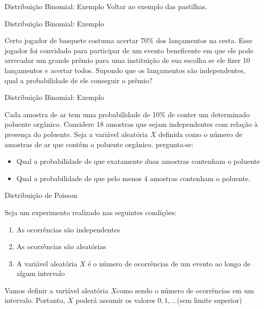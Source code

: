 \begin{frame}{Distribuição Binomial: Exemplo}
    Voltar ao exemplo das pastilhas. 
\end{frame}
\begin{frame}{Distribuição Binomial: Exemplo}
    \begin{exemplo}[14]
        Certo jogador de basquete costuma acertar 70\% dos lançamentos
na cesta. Esse jogador foi convidado para participar de um evento beneficente
em que ele pode arrecadar um grande prêmio para uma instituição de sua escolha se ele fizer 10 lançamentos e acertar todos. Supondo que os lançamentos
são independentes, qual a probabilidade de ele conseguir o prêmio?
    \end{exemplo}
\end{frame}

\begin{frame}{Distribuição Binomial: Exemplo}
    \begin{exemplo}[16]
        Cada amostra de ar tem uma probabilidade de 10\% de conter um determinado poluente orgânico. Considere 18 amostras que sejam independentes com relação à presença do poluente. Seja a variável aleatória $X$ definida como o número de amostras de ar que contêm o poluente orgânico. pergunta-se:

        \begin{itemize}
            \item Qual a probabilidade de que exatamente duas amostras contenham o poluente
            \item Qual a probabilidade de que pelo menos 4 amostras contenham o poluente. 
        \end{itemize}
    \end{exemplo}
\end{frame}

\begin{frame}{Distribuição de Poisson}

Seja um experimento realizado nas seguintes condições:

\begin{enumerate}
    \item As ocorrências são independentes
    \item As ocorrências são aleatórias
    \item A variável aleatória $X$ é o número de ocorrências de um evento ao longo de algum intervalo
\end{enumerate}

    Vamos definir a variável aleatória $X$como sendo o número de ocorrências em um intervalo. Portanto, $X$ poderá assumir os valores $0, 1, \dots $(sem limite superior)
\end{frame}

